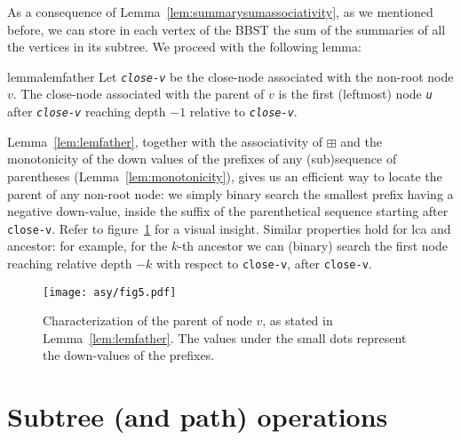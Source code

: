 \documentclass[a4paper,USenglish]{lipics}
\newcommand{\var}[1]{\textrm{\texttt{#1}}}
\begin{document}
		As a consequence of Lemma~\ref{lem:summarysumassociativity},  as we mentioned before, we can store in each vertex of the BBST the sum of the summaries of all the vertices in its subtree. We proceed with the following lemma:
\begin{restatable}{lemma}{lemfather}
		\label{lem:lemfather}
		Let \emph{\var{close-v}} be the close-node associated with the non-root node $v$. The close-node associated with the parent of $v$ is the first (leftmost) node \emph{\var{u}} after \emph{\var{close-v}} reaching depth $-1$ relative to \emph{\var{close-v}}.
\end{restatable}
Lemma~\ref{lem:lemfather}, together with the associativity of $\boxplus$ and the monotonicity of the down values of the prefixes of any (sub)sequence of parentheses (Lemma~\ref{lem:monotonicity}), gives us an efficient way to locate the parent of any non-root node: we simply binary search the smallest prefix having a negative down-value, inside the suffix of the parenthetical sequence starting after \var{close-v}. Refer to figure~\ref{fig:father} for a visual insight. Similar properties hold for lca and ancestor: for example, for the $k$-th ancestor we can (binary) search the first node reaching relative depth $-k$ with respect to \var{close-v}, after \var{close-v}.
\begin{figure}[t]
\centering\texttt{[image: asy/fig5.pdf]}
\caption{Characterization of the parent of node $v$, as stated in Lemma~\ref{lem:lemfather}. The values under the small dots represent the down-values of the prefixes.\label{fig:father}}
\end{figure}
		
\section{Subtree (and path) operations}
\label{sec:operations}
\end{document}
